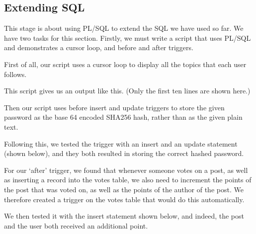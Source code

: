 \subsection{Extending SQL}

This stage is about using PL/SQL to extend the SQL we have used so far. We have two tasks for this section. Firstly, we must write a script that uses PL/SQL and demonstrates a cursor loop, and before and after triggers.

First of all, our script uses a cursor loop to display all the topics that each user follows.


This script gives us an output like this. (Only the first ten lines are shown here.)


Then our script uses before insert and update triggers to store the given password as the base 64 encoded SHA256 hash, rather than as the given plain text.


Following this, we tested the trigger with an insert and an update statement (shown below), and they both resulted in storing the correct hashed password.


For our `after' trigger, we found that whenever someone votes on a post, as well as inserting a record into the votes table, we also need to increment the points of the post that was voted on, as well as the points of the author of the post. We therefore created a trigger on the votes table that would do this automatically.


We then tested it with the insert statement shown below, and indeed, the post and the user both received an additional point.

